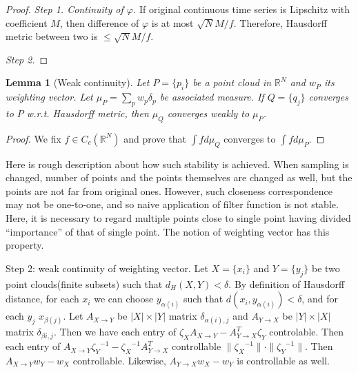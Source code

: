 \documentclass{article}
\newcommand{\R}{\mathbb{R}}
\newtheorem{lem}{Lemma}
\begin{document}
\begin{proof}

\emph{Step 1. Continuity of $\varphi$. }
If original continuous time series is Lipschitz with coefficient $M$, then difference of $\varphi$ is at most $\sqrt{N}M/f$.
Therefore, Hausdorff metric between two is $\leq \sqrt{N}M/f$.

\emph{Step 2. }


\end{proof}


\begin{lem}[Weak continuity]
Let $P=\{p_i\}$ be a point cloud in $\R^N$ and $w_P$ its weighting vector. 
Let $\mu_P = \sum_p w_p \delta_p$ be associated measure. 
If $Q=\{q_j\}$ converges to $P$ w.r.t. Hausdorff metric, then $\mu_Q$ converges weakly to $\mu_P$.
\end{lem}

\begin{proof}
We fix $f \in C_c{(\R^N)}$ and prove that $\int f d\mu_Q$ converges to $\int f d\mu_P$.
\end{proof}

Here is rough description about how such stability is achieved. 
When sampling is changed, number of points and the points themselves are changed as well, but the points are not far from original ones. 
However, such closeness correspondence may not be one-to-one, and so naive application of filter function is not stable. 
Here, it is necessary to regard multiple points close to single point having divided ``importance'' of that of single point. 
The notion of weighting vector \cite{Leinster2013} has this property.


Step 2: weak continuity of weighting vector. 
Let $X=\{x_i\}$ and $Y=\{y_j\}$ be two point clouds(finite subsets) such that $d_H(X,Y) < \delta$. 
By definition of Hausdorff distance, for each $x_i$ we can choose $y_{\alpha(i)}$ such that $d(x_i, y_{\alpha(i)}) < \delta$, and for each $y_j$ $x_{\beta(j)}$. 
Let $A_{X \rightarrow Y}$ be $|X|\times|Y|$ matrix $\delta_{\alpha(i),j}$ and $A_{Y \rightarrow X}$ be $|Y|\times|X|$ matrix $\delta_{\beta{i},j}$.
Then we have each entry of $\zeta_X A_{X \rightarrow Y} - A_{Y \rightarrow X}^T \zeta_Y$ controlable. 
Then each entry of $A_{X \rightarrow Y} {\zeta_Y}^{-1} - {\zeta_X}^{-1} A_{Y \rightarrow X}^T$ controllable $\|{\zeta_X}^{-1}\| \cdot \|{\zeta_Y}^{-1}\|$.
Then $A_{X \rightarrow Y} w_Y - w_X$ controllable. 
Likewise, $A_{Y \rightarrow X} w_X - w_Y$ is controllable as well.
\end{document}
